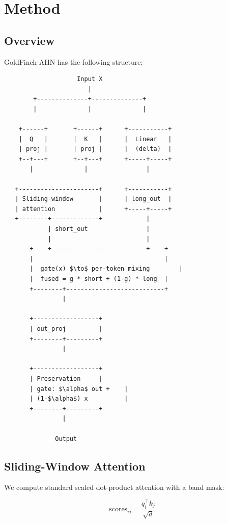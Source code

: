 
\section{Method}

\subsection{Overview}

GoldFinch-AHN has the following structure:

\begin{lstlisting}
                    Input X
                       |
        +--------------+--------------+
        |              |              |
                                       
    +------+       +------+      +-----------+
    |  Q   |       |  K   |      |  Linear   |
    | proj |       | proj |      |  (delta)  |
    +--+---+       +--+---+      +-----+-----+
       |              |                |
                                        
   +----------------------+      +-----------+
   | Sliding-window       |      | long_out  |
   | attention            |      +-----+-----+
   +--------+-------------+            |
            | short_out                |
            |                          |
       +----+--------------------------+----+
       |                                    |
       |  gate(x) $\to$ per-token mixing        |
       |  fused = g * short + (1-g) * long  |
       +--------+---------------------------+
                |
                 
       +------------------+
       | out_proj         |
       +--------+---------+
                |
                 
       +------------------+
       | Preservation     |
       | gate: $\alpha$ out +    |
       | (1-$\alpha$) x          |
       +--------+---------+
                |
                 
              Output
\end{lstlisting}

\subsection{Sliding-Window Attention}

We compute standard scaled dot-product attention with a band mask:

\[
\text{scores}_{ij} = \frac{q_i^\top k_j}{\sqrt{d}}
\tag{4.1}
\]

